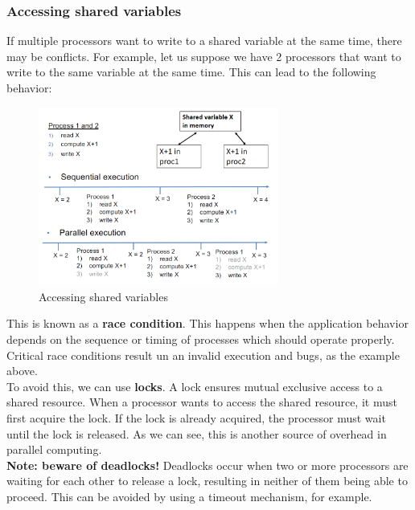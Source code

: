 \subsubsection{Accessing shared variables}

If multiple processors want to write to a shared variable at the same time, there
may be conflicts. For example, let us suppose we have 2 processors that want to write
to the same variable at the same time. This can lead to the following behavior:

\begin{figure}[H]
    \centering
    \includegraphics[width=0.7\textwidth]{figures/access_shared.png}
    \caption{Accessing shared variables}
    \label{fig:access_shared}
\end{figure}

This is known as a \textbf{race condition}. This happens when the application behavior
depends on the sequence or timing of processes which should operate properly. Critical
race conditions result un an invalid execution and bugs, as the example above.\\

To avoid this, we can use \textbf{locks}. A lock ensures mutual exclusive access to a
shared resource. When a processor wants to access the shared resource, it must first
acquire the lock. If the lock is already acquired, the processor must wait until the
lock is released. As we can see, this is another source of overhead in parallel computing.\\

\textbf{Note: beware of deadlocks!} Deadlocks occur when two or more processors are
waiting for each other to release a lock, resulting in neither of them being able to
proceed. This can be avoided by using a timeout mechanism, for example.

